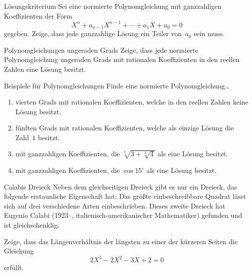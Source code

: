 \documentclass{algblatt}
\begin{document}

\begin{aufgabe}{Lösungskriterium}
Sei eine normierte Polynomgleichung mit ganzzahligen Koeffizienten
der Form
\[ X^n + a_{n-1} X^{n-1} + \cdots + a_1 X + a_0 = 0 \]
gegeben. Zeige, dass
jede ganzzahlige Lösung ein Teiler von~$a_0$ sein muss.
\end{aufgabe}

\begin{aufgabe}{Polynomgleichungen ungeraden Grads}
Zeige, dass jede normierte Polynomgleichung ungeraden Grads mit rationalen
Koeffizienten in den reellen Zahlen eine Lösung besitzt.
\end{aufgabe}

\begin{aufgabe}{Beispiele für Polynomgleichungen}
Finde eine normierte Polynomgleichung\ldots
\begin{enumerate}
\item vierten Grads mit rationalen
Koeffizienten, welche in den reellen Zahlen keine Lösung besitzt.
\item fünften Grads mit rationalen
Koeffizienten, welche als einzige Lösung die Zahl~$1$ besitzt.
\item mit ganzzahligen Koeffizienten, die
$\sqrt[7]{3 + \sqrt[3]{4}}$ als eine Lösung besitzt.
\item mit ganzzahligen Koeffizienten, die
$\cos 15^\circ$ als eine Lösung besitzt.
\end{enumerate}
\end{aufgabe}

\begin{aufgabe}{Calabis Dreieck}
Neben dem gleichseitigen Dreieck gibt es nur ein Dreieck, das folgende erstaunliche
Eigenschaft hat: Das größte 
einbeschreibbare Quadrat lässt sich auf drei verschiedene Arten einbeschrieben.
Dieses zweite Dreieck hat Eugenio Calabi (1923--, italienisch-amerikanischer
Mathematiker) gefunden und ist gleichschenklig.

Zeige, dass das
Längenverhältnis der längsten zu
einer der kürzeren Seiten die Gleichung
\[ 2 X^3 - 2 X^2 - 3 X + 2 = 0 \]
erfüllt. \\[1em]

\begin{center}
  \scalebox{0.5}{}
\end{center}
\end{aufgabe}
\end{document}
